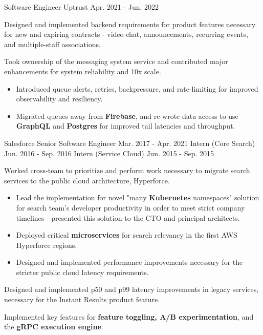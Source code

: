 
\begin{cventries}

  \cventry
    {Software Engineer} %
    {Uptrust} %
    {} %
    {Apr. 2021 - Jun. 2022} %
    {
      \begin{cvitems} %
        \item {Designed and implemented backend requirements for product features necessary for new and expiring contracts - video chat, announcements, recurring events, and multiple-staff associations.}
        \item {Took ownership of the messaging system service and contributed major enhancements for system reliability and 10x scale.}
        \begin{itemize}
          \item {Introduced queue alerts, retries, backpressure, and rate-limiting for improved observability and resiliency.}
          \item {Migrated queues away from \textbf{Firebase}, and re-wrote data access to use \textbf{GraphQL} and \textbf{Postgres} for improved tail latencies and throughput.}
        \end{itemize}
      \end{cvitems}
    }

  \cvthreeentry
    {Salesforce} %
    {} %
    {Senior Software Engineer}
    {Mar. 2017 - Apr. 2021}
    {Intern (Core Search)}
    {Jun. 2016 - Sep. 2016}
    {Intern (Service Cloud)}
    {Jun. 2015 - Sep. 2015}
    {
      \begin{cvitems} %
      \item {Worked cross-team to prioritize and perform work necessary to migrate search services to the public cloud architecture, Hyperforce.}
        \begin{itemize}
          \item {Lead the implementation for novel "many \textbf{Kubernetes} namespaces" solution for search team's developer productivity in order to meet strict company timelines - presented this solution to the CTO and principal architects.}
          \item {Deployed critical \textbf{microservices} for search relevancy in the first AWS Hyperforce regions.}
          \item {Designed and implemented performance improvements necessary for the stricter public cloud latency requirements.}
        \end{itemize}
        \item {Designed and implemented p50 and p99 latency improvements in legacy services, necessary for the Instant Results product feature.}
        \item {Implemented key features for \textbf{feature toggling, A/B experimentation}, and the \textbf{gRPC execution engine}.}
      \end{cvitems}
    }


\end{cventries}
